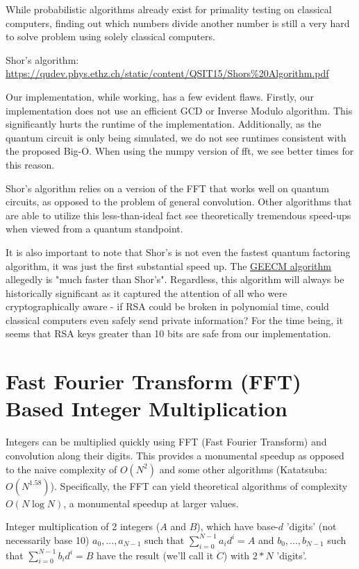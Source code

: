 \documentclass[a4paper,11pt]{article}
\theoremstyle{mytheor}
\begin{document}
While probabilistic algorithms already exist for primality testing on classical computers, finding out which numbers divide another number is still a very hard to solve problem using solely classical computers.

Shor's algorithm: \href{https://qudev.phys.ethz.ch/static/content/QSIT15/Shors\%20Algorithm.pdf}{https://qudev.phys.ethz.ch/static/content/QSIT15/Shors\%20Algorithm.pdf}

Our implementation, while working, has a few evident flaws. Firstly, our implementation does not use an efficient GCD or Inverse Modulo algorithm. This significantly hurts the runtime of the implementation. Additionally, as the quantum circuit is only being simulated, we do not see runtimes consistent with the proposed Big-O. When using the numpy version of fft, we see better times for this reason.

Shor's algorithm relies on a version of the FFT that works well on quantum circuits, as opposed to the problem of general convolution. Other algorithms that are able to utilize this less-than-ideal fact see theoretically tremendous speed-ups when viewed from a quantum standpoint.

It is also important to note that Shor's is not even the fastest quantum factoring algorithm, it was just the first substantial speed up. The \href{https://eprint.iacr.org/2017/351.pdf}{GEECM algorithm} allegedly is "much faster than Shor's". Regardless, this algorithm will always be historically significant as it captured the attention of all who were cryptographically aware - if RSA could be broken in polynomial time, could classical computers even safely send private information? For the time being, it seems that RSA keys greater than 10 bits are safe from our implementation.



\section{Fast Fourier Transform (FFT) Based Integer Multiplication}\label{sec:mult}

Integers can be multiplied quickly using FFT (Fast Fourier Transform) and convolution along their digits. This provides a monumental speedup as opposed to the naive complexity of $O(N^2)$ and some other algorithms (Katatsuba: $O(N^{1.58})$). Specifically, the FFT can yield theoretical algorithms of complexity $O(N \log N)$, a monumental speedup at larger values.

Integer multiplication of 2 integers ($A$ and $B$), which have base-$d$ 'digits' (not necessarily base 10) $a_0, ..., a_{N-1}$ such that $\sum_{i=0}^{N-1} a_i d^i = A$ and $b_0, ..., b_{N-1}$ such that $\sum_{i=0}^{N-1} b_i d^i = B$ have the result (we'll call it $C$) with $2*N$ 'digits'.
\end{document}
